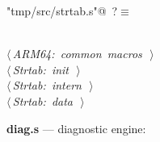 \documentclass[11pt,a4paper,twoside,openright,DIV=15]{scrbook}
\theoremstyle{definition}
\theoremstyle{plain}
\theoremstyle{remark}
\begin{document}
\begin{flushleft} \small
\begin{minipage}{\linewidth}\label{scrap92}\raggedright\small
{} \verb@"tmp/src/strtab.s"@\nobreak\ {\footnotesize {?}}$\equiv$
\vspace{-1ex}
\begin{list}{}{} \item
\mbox{}\verb@@\\
\mbox{}\verb@@\hbox{$\langle\,${\itshape ARM64: common macros}\nobreak\ {\footnotesize {}}$\,\rangle$}\verb@@\\
\mbox{}\verb@@\hbox{$\langle\,${\itshape Strtab: init}\nobreak\ {\footnotesize {}}$\,\rangle$}\verb@@\\
\mbox{}\verb@@\hbox{$\langle\,${\itshape Strtab: intern}\nobreak\ {\footnotesize {}}$\,\rangle$}\verb@@\\
\mbox{}\verb@@\hbox{$\langle\,${\itshape Strtab: data}\nobreak\ {\footnotesize {}}$\,\rangle$}\verb@@\\
\mbox{}\verb@@{\NWsep}
\end{list}
\vspace{-1.5ex}
\footnotesize
\begin{list}{}{\setlength{\itemsep}{-\parsep}\setlength{\itemindent}{-\leftmargin}}

\item{}
\end{list}
\end{minipage}\vspace{4ex}
\end{flushleft}
\noindent\textbf{diag.s} --- diagnostic engine:
\end{document}
